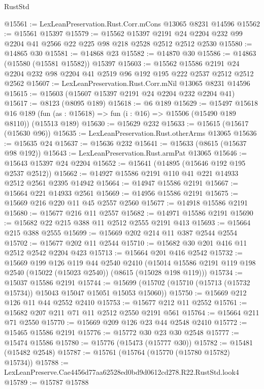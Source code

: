 \begin{lexlean}{RustStd}
\begin{coremodule}
@15561 := LexLeanPreservation.Rust.Corr.mCons @13065 @8231 @14596
@15562 := @15561 @15397
@15579 := @15562
    @15397
    @2191
    @24
    @2204
    @232
    @99
    @2204
    @41
    @2566
    @22
    @225
    @98
    @218
    @2528
    @2512
    @2512
    @2530
@15580 := @14865 @30
@15581 := @14868 @23
@15582 := @14870 @30
@15586 := @14863 (@15580 (@15581 @15582)) @15397
@15603 := @15562
    @15586
    @2191
    @24
    @2204
    @232
    @98
    @2204
    @41
    @2519
    @96
    @192
    @195
    @222
    @2537
    @2512
    @2512
    @2562
@15607 := LexLeanPreservation.Rust.Corr.mNil @13065 @8231 @14596
@15615 := @15603 (@15607 @15397 @2191 @24 @2204 @232 @2204 @41)
@15617 := @8123 (@8095 @189)
@15618 := @6 @189
@15629 := @15497
    @15618
    @16
    @189
    (fun (as : @15618) => fun (i : @16) => @15506 (@15490 @189 @8110))
    (@15513 @189)
@15630 := @15629 @232
@15633 := @15615 (@15617 (@15630 @96))
@15635 := LexLeanPreservation.Rust.otherArms @13065
@15636 := @15635 @24
@15637 := @15636 @232
@15641 := @15633 (@8615 (@15637 @98 @192))
@15643 := LexLeanPreservation.Rust.armPat @13065
@15646 := @15643 @15397 @24 @2204
@15652 := @15641 (@14895 (@15646 @192 @195 @2537 @2512))
@15662 := @14927 @15586 @2191 @110 @41 @221 @14933 @2512 @2561 @2395 @14942
@15664 := @14947 @15586 @2191
@15667 := @15664 @221 @14933 @2561
@15669 := @14956 @15586 @2191
@15675 := @15669 @216 @220 @11 @45 @2557 @2560
@15677 := @14918 @15586 @2191
@15680 := @15677 @216 @11 @2557
@15682 := @14971 @15586 @2191
@15690 := @15682 @22 @215 @388 @11 @2512 @2555 @2191 @413
@15693 := @15664 @215 @388 @2555
@15699 := @15669 @202 @214 @11 @387 @2544 @2554
@15702 := @15677 @202 @11 @2544
@15710 := @15682 @30 @201 @416 @11 @2512 @2542 @2204 @423
@15713 := @15664 @201 @416 @2542
@15732 := @15669
    @199
    @126
    @119
    @44
    @2540
    @2410
    (@15014 @15586 @2191 @119 @198 @2540 (@15022 (@15023 @2540)) (@8615 (@15028 @198 @119)))
@15734 := @15037 @15586 @2191
@15744 := @15699 (@15702 (@15710 (@15713 (@15732 @15734)) @15043 @15047 @15051 @15053 @15060))
@15750 := @15669 @212 @126 @11 @44 @2552 @2410
@15753 := @15677 @212 @11 @2552
@15761 := @15682 @207 @211 @71 @11 @2512 @2550 @2191 @561
@15764 := @15664 @211 @71 @2550
@15770 := @15669 @209 @126 @23 @44 @2548 @2410
@15772 := @15465 @15586 @2191
@15776 := @15772 @30 @23 @30 @2548
@15777 := @15474 @15586
@15780 := @15776 (@15473 (@15777 @30))
@15782 := @15481 (@15482 @2548)
@15787 := @15761 (@15764 (@15770 (@15780 @15782) @15734))
@15788 := LexLeanPreserve.Cae4456d77aa62528ed0bd9d0612cd278.R22.RustStd.look4
@15789 := @15787 @15788

\end{coremodule}
\end{lexlean}
